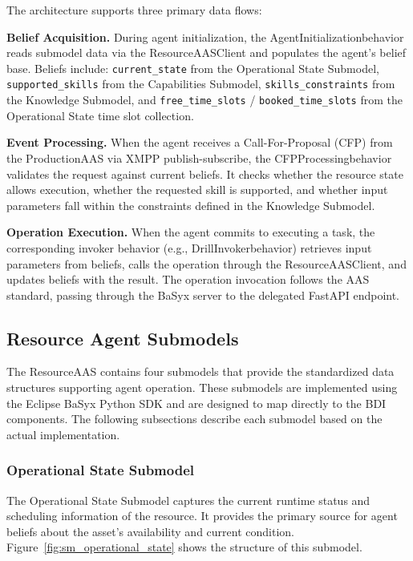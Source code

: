 The architecture supports three primary data flows:

\textbf{Belief Acquisition.} During agent initialization, the AgentInitializationbehavior reads submodel data via the ResourceAASClient and populates the agent's belief base. Beliefs include: \texttt{current\_state} from the Operational State Submodel, \texttt{supported\_skills} from the Capabilities Submodel, \texttt{skills\_constraints} from the Knowledge Submodel, and \texttt{free\_time\_slots} / \texttt{booked\_time\_slots} from the Operational State time slot collection.

\textbf{Event Processing.} When the agent receives a Call-For-Proposal (CFP) from the ProductionAAS via \ac{XMPP} publish-subscribe, the CFPProcessingbehavior validates the request against current beliefs. It checks whether the resource state allows execution, whether the requested skill is supported, and whether input parameters fall within the constraints defined in the Knowledge Submodel.

\textbf{Operation Execution.} When the agent commits to executing a task, the corresponding invoker behavior (e.g., DrillInvokerbehavior) retrieves input parameters from beliefs, calls the operation through the ResourceAASClient, and updates beliefs with the result. The operation invocation follows the \ac{AAS} standard, passing through the BaSyx server to the delegated FastAPI endpoint.

\subsection{Resource Agent Submodels}
\label{subsec:resource_submodels}

The ResourceAAS contains four submodels that provide the standardized data structures supporting agent operation. These submodels are implemented using the Eclipse BaSyx Python SDK and are designed to map directly to the \ac{BDI} components. The following subsections describe each submodel based on the actual implementation.


\subsubsection{Operational State Submodel}

The Operational State Submodel captures the current runtime status and scheduling information of the resource. It provides the primary source for agent beliefs about the asset's availability and current condition. Figure~\ref{fig:sm_operational_state} shows the structure of this submodel.

